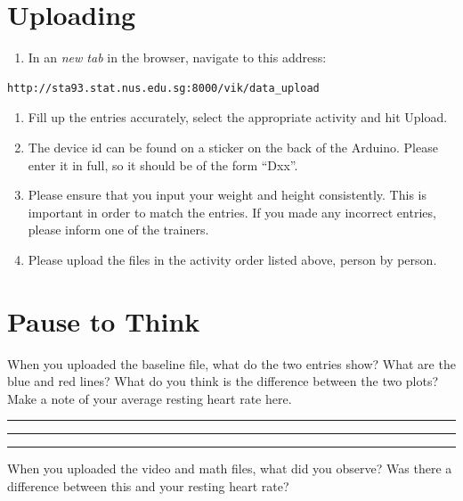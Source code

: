 \documentclass[11pt]{article}
\providecommand{\tightlist}{%
  \setlength{\itemsep}{0pt}\setlength{\parskip}{0pt}}
\begin{document}
\hypertarget{uploading}{%
\section{Uploading}\label{uploading}}

\begin{enumerate}
\def\labelenumi{\arabic{enumi}.}
\tightlist
\item
  In an \emph{new tab} in the browser, navigate to this address:
\end{enumerate}

\begin{verbatim}
http://sta93.stat.nus.edu.sg:8000/vik/data_upload
\end{verbatim}

\begin{enumerate}
\def\labelenumi{\arabic{enumi}.}
\setcounter{enumi}{1}
\tightlist
\item
  Fill up the entries accurately, select the appropriate activity and
  hit Upload.
\item
  The device id can be found on a sticker on the back of the Arduino.
  Please enter it in full, so it should be of the form ``Dxx''.
\item
  Please ensure that you input your weight and height consistently. This
  is important in order to match the entries. If you made any incorrect
  entries, please inform one of the trainers.
\item
  Please upload the files in the activity order listed above, person by
  person.
\end{enumerate}

\hypertarget{pause-to-think}{%
\section{Pause to Think}\label{pause-to-think}}

When you uploaded the baseline file, what do the two entries show? What
are the blue and red lines? What do you think is the difference between
the two plots? Make a note of your average resting heart rate here.

\vspace{1.5em}
\rule{16cm}{0.5pt}

\vspace{1.5em}
\rule{16cm}{0.5pt}

\vspace{1.5em}
\rule{16cm}{0.5pt}

When you uploaded the video and math files, what did you observe? Was
there a difference between this and your resting heart rate?
\end{document}
